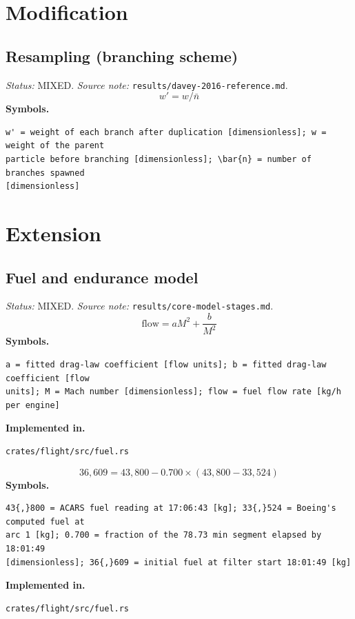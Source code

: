 \documentclass[11pt,a4paper]{article}
\begin{document}
\section{Modification}
\subsection{Resampling (branching scheme)}
\noindent\textit{Status:} MIXED. \textit{Source note:} \texttt{results/davey-2016-reference.md}.
\medskip
\begin{equation}
w' = w / \bar{n}
\end{equation}
\noindent\textbf{Symbols.}
\begin{verbatim}
w' = weight of each branch after duplication [dimensionless]; w = weight of the parent
particle before branching [dimensionless]; \bar{n} = number of branches spawned
[dimensionless]
\end{verbatim}
\medskip
\section{Extension}
\subsection{Fuel and endurance model}
\noindent\textit{Status:} MIXED. \textit{Source note:} \texttt{results/core-model-stages.md}.
\medskip
\begin{equation}
\text{flow} = aM^2 + \frac{b}{M^2}
\end{equation}
\noindent\textbf{Symbols.}
\begin{verbatim}
a = fitted drag-law coefficient [flow units]; b = fitted drag-law coefficient [flow
units]; M = Mach number [dimensionless]; flow = fuel flow rate [kg/h per engine]
\end{verbatim}
\noindent\textbf{Implemented in.}
\begin{verbatim}
crates/flight/src/fuel.rs
\end{verbatim}
\medskip
\begin{equation}
36{,}609 = 43{,}800 - 0.700 \times (43{,}800 - 33{,}524)
\end{equation}
\noindent\textbf{Symbols.}
\begin{verbatim}
43{,}800 = ACARS fuel reading at 17:06:43 [kg]; 33{,}524 = Boeing's computed fuel at
arc 1 [kg]; 0.700 = fraction of the 78.73 min segment elapsed by 18:01:49
[dimensionless]; 36{,}609 = initial fuel at filter start 18:01:49 [kg]
\end{verbatim}
\noindent\textbf{Implemented in.}
\begin{verbatim}
crates/flight/src/fuel.rs
\end{verbatim}
\medskip
\end{document}

